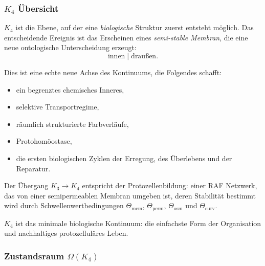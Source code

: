 

\subsubsection{\texorpdfstring{$K_4$}{K_4} Übersicht}
\label{sec:k4-overview}

$K_4$ ist die Ebene, auf der eine \emph{biologische} Struktur zuerst entsteht
möglich. Das entscheidende Ereignis ist das Erscheinen eines \emph{semi-stable
Membran}, die eine neue ontologische Unterscheidung erzeugt:
\[
\text{innen} \;|\; \text{draußen}.
\]

Dies ist eine echte neue Achse des Kontinuums, die Folgendes schafft:
\begin{itemize}
    \item ein begrenztes chemisches Inneres,
    \item selektive Transportregime,
    \item räumlich strukturierte Farbverläufe,
    \item Protohomöostase,
    \item die ersten biologischen Zyklen der Erregung, des Überlebens und der Reparatur.
\end{itemize}

Der Übergang $K_3 \to K_4$ entspricht der Protozellenbildung: einer RAF
Netzwerk, das von einer semipermeablen Membran umgeben ist, deren Stabilität bestimmt wird
durch Schwellenwertbedingungen $\Theta_{\mathrm{mem}}$,
$\Theta_{\mathrm{perm}}$, $\Theta_{\mathrm{osm}}$ und
$\Theta_{\mathrm{curv}}$.

$K_4$ ist das minimale biologische Kontinuum: die einfachste Form der Organisation
und nachhaltiges protozelluläres Leben.

\subsubsection{Zustandsraum \texorpdfstring{$\Omega(K_4)$}{\Omega(K_4)}}


